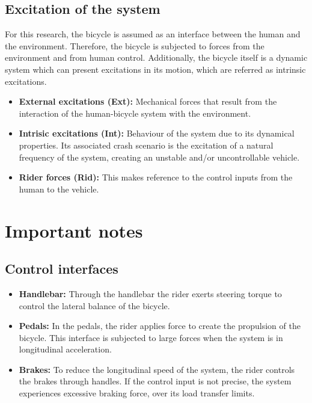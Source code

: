 \documentclass{article}
\begin{document}
\subsection{Excitation of the system}

For this research, the bicycle is assumed as an interface between the human and the environment.
%
Therefore, the bicycle is subjected to forces from the environment and from human control.
%
Additionally, the bicycle itself is a dynamic system which can present excitations in its motion, which are referred as intrinsic excitations.


\begin{itemize}
    \item \textbf{External excitations (Ext):} Mechanical forces that result from the interaction of the human-bicycle system with the environment.
    \item \textbf{Intrisic excitations (Int):} Behaviour of the system due to its dynamical properties.
        Its associated crash scenario is the excitation of a natural frequency of the system, creating an unstable and/or uncontrollable vehicle.
    \item \textbf{Rider forces (Rid):} This makes reference to the control inputs from the human to the vehicle.
\end{itemize}


\section{Important notes}


\subsection{Control interfaces}

\begin{itemize}
    \item \textbf{Handlebar:} Through the handlebar the rider exerts steering torque to control the lateral balance of the bicycle.
    \item \textbf{Pedals:} In the pedals, the rider applies force to create the propulsion of the bicycle.
        This interface is subjected to large forces when the system is in longitudinal acceleration.
    \item \textbf{Brakes:} To reduce the longitudinal speed of the system, the rider controls the brakes through handles.
        If the control input is not precise, the system experiences excessive braking force, over its load transfer limits.
\end{itemize}
\end{document}
